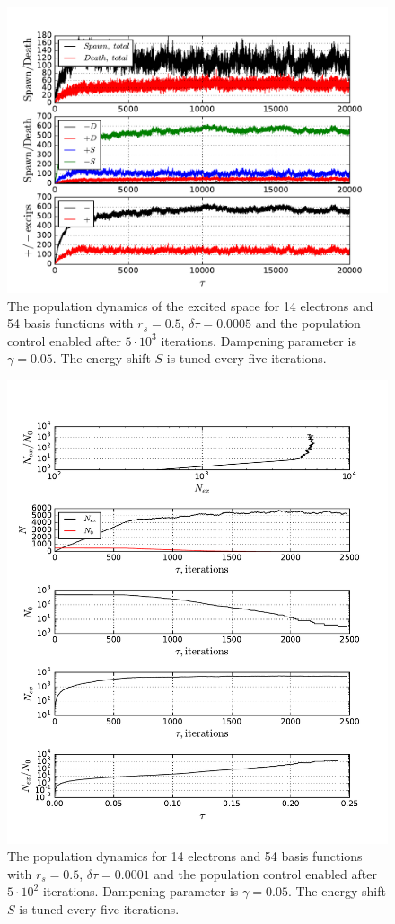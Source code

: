 \documentclass[twoside,english]{uiofysmaster}
\begin{document}
\begin{landscape}
	
	\begin{figure}[ht!]
		\centering
		\includegraphics[width=0.8\linewidth]{platFindStune}
		\caption{The population dynamics of the excited space for 14 electrons and 54 basis functions with $r_s=0.5$, $\delta \tau=0.0005$ and the population control enabled after $5\cdot 10^3$ iterations. Dampening parameter is $\gamma = 0.05$. The energy shift $S$ is tuned every five iterations.}
		\label{fig:platFindStune}
	\end{figure}
	
\end{landscape}



\begin{figure}[ht!]
	\centering
	\includegraphics[width=0.8\linewidth]{deathN0}
	\caption{The population dynamics for 14 electrons and 54 basis functions with $r_s=0.5$, $\delta \tau=0.0001$ and the population control enabled after $5\cdot 10^2$ iterations. Dampening parameter is $\gamma = 0.05$. The energy shift $S$ is tuned every five iterations.}
	\label{fig:deathN0}
\end{figure}
\end{document}
